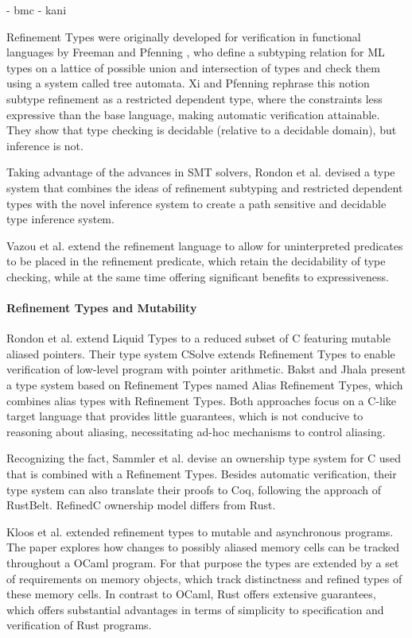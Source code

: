 \documentclass[twoside, english]{sdqthesis}
\theoremstyle{definition}
\begin{document}
- bmc
- kani

Refinement Types were originally developed for verification in functional languages by Freeman and Pfenning \cite{freeman_refinement_1991}, who define a subtyping relation for ML types on a lattice of possible union and intersection of types and check them using a system called tree automata. 
Xi and Pfenning \cite{xi_dependent_1999} rephrase this notion subtype refinement as a restricted dependent type, where the constraints less expressive than the base language, making automatic verification attainable. They show that type checking is decidable (relative to a decidable domain), but inference is not.

Taking advantage of the advances in SMT solvers, Rondon et al. \cite{rondon_liquid_2008} devised a type system that combines the ideas of refinement subtyping and restricted dependent types with the novel inference system to create a path sensitive and decidable type inference system.

Vazou et al. \cite{vazou_abstract_2013} extend the refinement language to allow for uninterpreted predicates to be placed in the refinement predicate, which retain the decidability of type checking, while at the same time offering significant benefits to expressiveness. 

\paragraph*{Refinement Types and Mutability} 

Rondon et al. \cite{rondon_low-level_2010} extend Liquid Types to a reduced subset of C featuring mutable aliased pointers. Their type system CSolve extends Refinement Types to enable verification of low-level program with pointer arithmetic.
Bakst and Jhala \cite{bakst_predicate_2016} present a type system based on Refinement Types named Alias Refinement Types, which combines alias types with Refinement Types.
Both approaches focus on a C-like target language that provides little guarantees, which is not conducive to reasoning about aliasing, necessitating ad-hoc mechanisms to control aliasing.

Recognizing the fact, Sammler et al. \cite{sammler_refinedc_2021} devise an ownership type system for C used that is combined with a Refinement Types. 
Besides automatic verification, their type system can also translate their proofs to Coq, following the approach of RustBelt.
RefinedC ownership model differs from Rust.

Kloos et al. \cite{kloos_asynchronous_2015} extended refinement types to mutable and asynchronous programs. The paper explores how changes to possibly aliased memory cells can be tracked throughout a OCaml program. For that purpose the types are extended by a set of requirements on memory objects, which track distinctness and refined types of these memory cells. In contrast to OCaml, Rust offers extensive guarantees, which offers substantial advantages in terms of simplicity to specification and verification of Rust programs.
\end{document}
